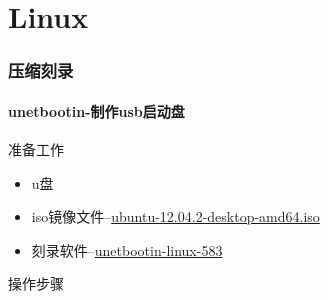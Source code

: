 \part{Linux}
\setcounter{section}{0}
\clearpage
\section{压缩刻录}
\subsection{unetbootin-制作usb启动盘}
准备工作
\begin{itemize}
\item u盘
\item iso镜像文件--\href{http://releases.ubuntu.com/precise/}{ubuntu-12.04.2-desktop-amd64.iso}
\item 刻录软件--\href{http://www.oschina.net/news/9166/oschina-os-week-recommended-UNetbootin}{unetbootin-linux-583}
\end{itemize} 
操作步骤
